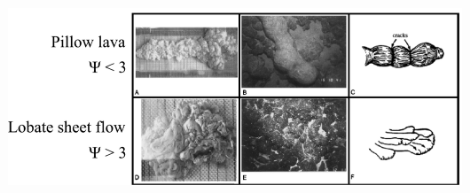 \documentclass[aguposter,landscape]{baposter}
\begin{document}
\begin{poster}
{\begin{minipage}[t]{0.49\linewidth}
\begin{center}
      \end{center}
      \vspace{0.5em}
      \begin{center}
        \vspace{0.5em}
        \includegraphics[width=0.9\textwidth]{lavamorphology03_GreggFink_Geology_1995.png}
        \citep{Gregg1995}
      \end{center}
      
      \vspace{0.5em}
    \end{minipage}
}


\end{poster}
\end{document}
